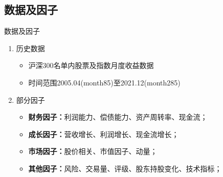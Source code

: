 \documentclass[CJK,aspectratio=43]{beamer}  %
\begin{document}
\subsection{数据及因子}
\begin{frame}{数据及因子}
	\begin{enumerate}
		\item 历史数据
		\begin{itemize}
			\item 沪深300名单内股票及指数月度收益数据
			\item 时间范围2005.04(month85)至2021.12(month285)
		\end{itemize}
		\item 部分因子
		\begin{itemize}
			\item \textbf{财务因子：}利润能力、偿债能力、资产周转率、现金流；
			\item \textbf{成长因子：}营收增长、利润增长、现金流增长；
			\item \textbf{市场因子：}股价相关、市值因子、动量；
			\item \textbf{其他因子：}风险、交易量、评级、股东持股变化、技术指标；
		\end{itemize}
	\end{enumerate}
	\begin{table}[htbp]
		\centering
		\label{tab:factors}%
		\caption{Factors}
	\end{table}%
\end{frame}
\end{document}
